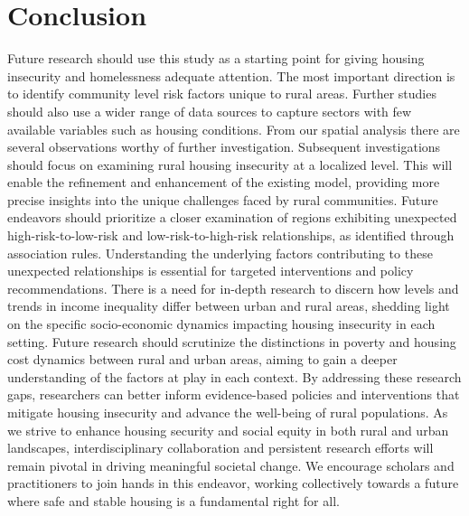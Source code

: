 \chapter{Conclusion}	%


Future research should use this study as a starting point for giving housing insecurity and homelessness adequate attention. The most important direction is to identify community level risk factors unique to rural areas. Further studies should also use a wider range of data sources to capture sectors with few available variables such as housing conditions. From our spatial analysis there are several observations worthy of further investigation. Subsequent investigations should focus on examining rural housing insecurity at a localized level. This will enable the refinement and enhancement of the existing model, providing more precise insights into the unique challenges faced by rural communities.	Future endeavors should prioritize a closer examination of regions exhibiting unexpected high-risk-to-low-risk and low-risk-to-high-risk relationships, as identified through association rules. Understanding the underlying factors contributing to these unexpected relationships is essential for targeted interventions and policy recommendations. There is a need for in-depth research to discern how levels and trends in income inequality differ between urban and rural areas, shedding light on the specific socio-economic dynamics impacting housing insecurity in each setting. Future research should scrutinize the distinctions in poverty and housing cost dynamics between rural and urban areas, aiming to gain a deeper understanding of the factors at play in each context. By addressing these research gaps, researchers can better inform evidence-based policies and interventions that mitigate housing insecurity and advance the well-being of rural populations. As we strive to enhance housing security and social equity in both rural and urban landscapes, interdisciplinary collaboration and persistent research efforts will remain pivotal in driving meaningful societal change. We encourage scholars and practitioners to join hands in this endeavor, working collectively towards a future where safe and stable housing is a fundamental right for all.  
\endinput
